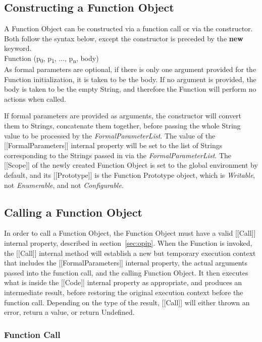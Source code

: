 \documentclass[a4paper,11pt,twoside]{report}
\newif\ifComments
\newcommand{\az}[1]{%
\ifComments
\begin{center}
\fbox{%
\begin{minipage}{3in} \color{red}
{\bf AZ:} {\rm #1}
\end{minipage}
}
\end{center}
\fi
}
\begin{document}
\subsection{Constructing a Function Object}
A Function Object can be constructed via a function call or via the constructor. Both follow the syntax below, except the constructor is preceded by the \textbf{new} keyword. \\
\indent Function (p\textsubscript{0}, p\textsubscript{1}, ..., p\textsubscript{n}, body) \\
As formal parameters are optional, if there is only one argument provided for the Function initialization, it is taken to be the body. If no argument is provided, the body is taken to be the empty String, and therefore the Function will perform no actions when called.

If formal parameters are provided as arguments, the constructor will convert them to Strings, concatenate them together, before passing the whole String value to be processed by the \textit{FormalParameterList}. The value of the [[FormalParameters]] internal property will be set to the list of Strings corresponding to the Strings passed in via the \textit{FormalParameterList}. The [[Scope]] of the newly created Function Object is set to the global environment by default, and its [[Prototype]] is the Function Prototype object, which is \textit{Writable}, not \textit{Enumerable}, and not \textit{Configurable}.

\subsection{Calling a Function Object}
In order to call a Function Object, the Function Object must have a valid [[Call]] internal property, described in section~\ref{sec:opip}. When the Function is invoked, the [[Call]] internal method will establish a new but temporary execution context that includes the [[FormalParameters]] internal property, the actual arguments passed into the function call, and the calling Function Object. It then executes what is inside the [[Code]] internal property as appropriate, and produces an intermediate result, before restoring the original execution context before the function call. Depending on the type of the result, [[Call]] will either thrown an error, return a value, or return Undefined. 
\az{TODO}
\subsubsection{Function Call}
\end{document}
